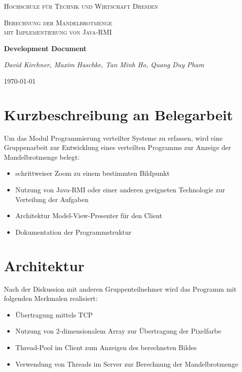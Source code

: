 \documentclass{article}
\begin{document}
\begin{titlepage}
    \centering
    {\scshape\LARGE Hochschule für Technik und Wirtschaft Dresden \par}
    \vspace{1cm}
    {\scshape\Large Berechnung der Mandelbrotmenge \\mit Implementierung von Java-RMI \par}
    \vspace{1.5cm}
    {\huge\bfseries Development Document\par}
    \vspace{2cm}
    {\Large\itshape David Kirchner, Maxim Haschke, Tan Minh Ho, Quang Duy Pham\par}
    \vfill

    {\large \today\par}
\end{titlepage}

\tableofcontents

\newpage
\section{Kurzbeschreibung an Belegarbeit}
	Um das Modul Programmierung verteilter Systeme zu erfassen, wird eine Gruppenarbeit zur Entwicklung eines verteilten Programms zur Anzeige der Mandelbrotmenge belegt:
	\begin{itemize}
		\item schrittweiser Zoom zu einem bestimmten Bildpunkt
		\item Nutzung von Java-RMI oder einer anderen geeigneten Technologie zur Verteilung der Aufgaben
		\item Architektur Model-View-Presenter für den Client
		\item Dokumentation der Programmstruktur
	\end{itemize}

\section{Architektur}
	Nach der Diskussion mit anderen Gruppenteilnehmer wird das Programm mit folgenden Merkmalen realisiert:
	\begin{itemize}
		\item Übertragung mittels TCP
		\item Nutzung von 2-dimensionalem Array zur Übertragung der Pixelfarbe
		\item Thread-Pool im Client zum Anzeigen des berechneten Bildes
		\item Verwendung von Threads im Server zur Berechnung der Mandelbrotmenge
	\end{itemize}
	
\end{document}
